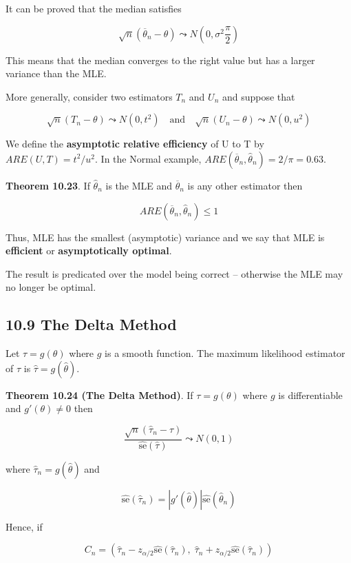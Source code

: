It can be proved that the median satisfies

\[ \sqrt{n}(\overline{\theta}_n - \theta) \leadsto N\left(0, \sigma^2 \frac{\pi}{2} \right) \]

This means that the median converges to the right value but has a larger
variance than the MLE.

More generally, consider two estimators \(T_n\) and \(U_n\) and suppose
that

\[
\sqrt{n}(T_n - \theta) \leadsto N(0, t^2) 
\quad \text{and} \quad 
\sqrt{n}(U_n - \theta) \leadsto N(0, u^2)
\]

We define the \textbf{asymptotic relative efficiency} of U to T by
\(ARE(U, T) = t^2/u^2\). In the Normal example,
\(ARE(\overline{\theta}_n, \hat{\theta}_n) = 2 / \pi = 0.63\).

\textbf{Theorem 10.23}. If \(\hat{\theta}_n\) is the MLE and
\(\overline{\theta}_n\) is any other estimator then

\[ ARE(\overline{\theta}_n, \hat{\theta}_n) \leq 1 \]

Thus, MLE has the smallest (asymptotic) variance and we say that MLE is
\textbf{efficient} or \textbf{asymptotically optimal}.

The result is predicated over the model being correct -- otherwise the
MLE may no longer be optimal.

\subsection{10.9 The Delta Method}\label{the-delta-method}

Let \(\tau = g(\theta)\) where \(g\) is a smooth function. The maximum
likelihood estimator of \(\tau\) is \(\hat{\tau} = g(\hat{\theta})\).

\textbf{Theorem 10.24 (The Delta Method)}. If \(\tau = g(\theta)\) where
\(g\) is differentiable and \(g'(\theta) \neq 0\) then

\[ \frac{\sqrt{n}(\hat{\tau}_n - \tau)}{\hat{\text{se}}(\hat{\tau})} \leadsto N(0, 1) \]

where \(\hat{\tau}_n = g(\hat{\theta})\) and

\[ \hat{\text{se}}(\hat{\tau}_n) = |g'(\hat{\theta})| \hat{\text{se}} (\hat{\theta}_n) \]

Hence, if

\[ C_n = \left( \hat{\tau}_n - z_{\alpha/2} \hat{\text{se}}(\hat{\tau}_n), \; \hat{\tau}_n + z_{\alpha/2} \hat{\text{se}}(\hat{\tau}_n) \right) \]

